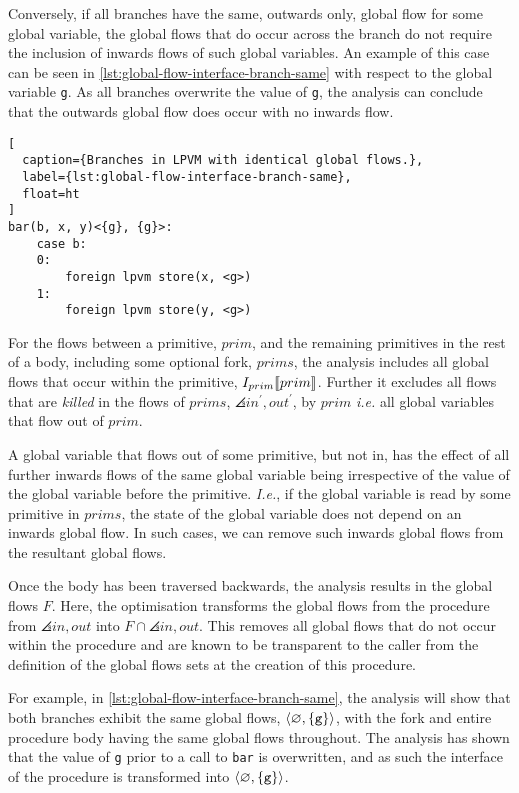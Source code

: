 Conversely, if all branches have the same, outwards only, global flow for some global variable, the global flows that do occur across the branch do not require the inclusion of inwards flows of such global variables. An example of this case can be seen in \cref{lst:global-flow-interface-branch-same} with respect to the global variable \texttt{g}. As all branches overwrite the value of \texttt{g}, the analysis can conclude that the outwards global flow does occur with no inwards flow.

\begin{lstlisting}[
  caption={Branches in LPVM with identical global flows.},
  label={lst:global-flow-interface-branch-same},
  float=ht
]
bar(b, x, y)<{g}, {g}>:
    case b:
    0: 
        foreign lpvm store(x, <g>)
    1:
        foreign lpvm store(y, <g>)
\end{lstlisting}

For the flows between a primitive, $prim$, and the remaining primitives in the rest of a body, including some optional fork, $prims$, the analysis includes all global flows that occur within the primitive, $I_{prim}\bbrackets{prim}$. Further it excludes all flows that are \textit{killed} in the flows of $prims$, $\angles{in^\prime, out^\prime}$, by $prim$ \textit{i.e.} all global variables that flow out of $prim$. 

A global variable that flows out of some primitive, but not in, has the effect of all further inwards flows of the same global variable being irrespective of the value of the global variable before the primitive. \textit{I.e.}, if the global variable is read by some primitive in $prims$, the state of the global variable does not depend on an inwards global flow. In such cases, we can remove such inwards global flows from the resultant global flows. 

Once the body has been traversed backwards, the analysis results in the global flows $F$. Here, the optimisation transforms the global flows from the procedure from $\angles{in, out}$ into $F \cap \angles{in, out}$. This removes all global flows that do not occur within the procedure and are known to be transparent to the caller from the definition of the global flows sets at the creation of this procedure.

For example, in \cref{lst:global-flow-interface-branch-same}, the analysis will show that both branches exhibit the same global flows, $\angles*{\varnothing, \set{\texttt{g}}}$, with the fork and entire procedure body having the same global flows throughout. The analysis has shown that the value of \texttt{g} prior to a call to \texttt{bar} is overwritten, and as such the interface of the procedure is transformed into $\angles*{\varnothing, \set{\texttt{g}}}$.

